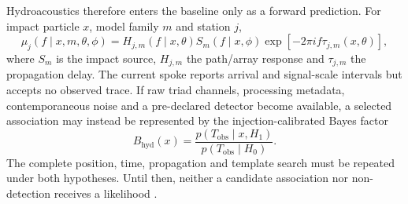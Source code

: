 Hydroacoustics therefore enters the baseline only as a forward prediction.
For impact particle $x$, model family $m$ and station $j$,
\begin{equation}
\mu_j(f\mid x,m,\theta,\phi) =
H_{j,m}(f\mid x,\theta)S_m(f\mid x,\phi)
\exp[-2\pi i f\tau_{j,m}(x,\theta)],
\label{eq:hydroacoustic-forward-prediction}
\end{equation}
where $S_m$ is the impact source, $H_{j,m}$ the path/array response and
$\tau_{j,m}$ the propagation delay. The current spoke reports arrival and
signal-scale intervals but accepts no observed trace. If raw triad channels,
processing metadata, contemporaneous noise and a pre-declared detector become
available, a selected association may instead be represented by the
injection-calibrated Bayes factor
\begin{equation}
B_{\mathrm{hyd}}(x)=
\frac{p(T_{\mathrm{obs}}\mid x,H_1)}{p(T_{\mathrm{obs}}\mid H_0)}.
\label{eq:conditional-hydroacoustic-bayes-factor}
\end{equation}
The complete position, time, propagation and template search must be repeated
under both hypotheses. Until then, neither a candidate association nor
non-detection receives a likelihood \citep{Farrell1997}.
